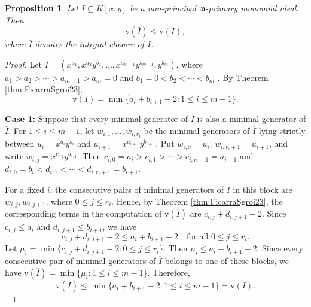 \documentclass[11pt,reqno,a4paper]{amsart}
\newtheorem{proposition}[theorem]{Proposition}
\theoremstyle{definition}
\begin{document}
\begin{proposition}\label{{v(I^bar)<=v(I)}}
Let \(I\subseteq K[x,y]\) be a non-principal \(\mathfrak m\)-primary
monomial ideal. Then
\[
\mathrm{v}(\overline{I})\leq \mathrm{v}(I),
\]
where \(\overline{I}\) denotes the integral closure of \(I\).
\end{proposition}

\begin{proof}
Let
\(I=(x^{a_1},x^{a_2}y^{b_2},\ldots,
x^{a_{m-1}}y^{b_{m-1}},y^{b_m})\), where
\(a_1>a_2>\cdots>a_{m-1}>a_{m}=0\) and
\(b_1=0<b_2<\cdots<b_m\) . 
By Theorem \ref{thm:FicarraSgroi23},
\begin{equation}\label{eq:vI}
\mathrm{v}(I)
=\min\{a_i+b_{i+1}-2:1\leq i\leq m-1\}.
\end{equation}



\noindent\textbf{Case 1:}
Suppose that every minimal generator of \(I\) is also a minimal
generator of \(\overline{I}\). For \(1\leq i\leq m-1\), let
\(w_{i,1},\ldots,w_{i,r_i}\) be the minimal generators of
\(\overline{I}\) lying strictly between
\(u_i=x^{a_i}y^{b_i}\) and
\(u_{i+1}=x^{a_{i+1}}y^{b_{i+1}}\). Put
\(w_{i,0}=u_i\), \(w_{i,r_i+1}=u_{i+1}\), and write
\(w_{i,j}=x^{c_{i,j}}y^{d_{i,j}}\). Then
\(c_{i,0}=a_i>c_{i,1}>\cdots>c_{i,r_i+1}=a_{i+1}\) and
\(d_{i,0}=b_i<d_{i,1}<\cdots<d_{i,r_i+1}=b_{i+1}\).

\noindent For a fixed \(i\), the consecutive pairs of minimal generators of
\(\overline{I}\) in this block are
\(w_{i,j},w_{i,j+1}\), where \(0\leq j\leq r_i\). Hence, by Theorem
\ref{thm:FicarraSgroi23}, the corresponding terms in the
computation of \(\mathrm{v}(\overline{I})\) are
\(c_{i,j}+d_{i,j+1}-2\). Since \(c_{i,j}\leq a_i\) and
\(d_{i,j+1}\leq b_{i+1}\), we have
\[
c_{i,j}+d_{i,j+1}-2\leq a_i+b_{i+1}-2
\quad\text{for all }0\leq j\leq r_i.
\]
Let
\(\mu_i=\min\{c_{i,j}+d_{i,j+1}-2:0\leq j\leq r_i\}\).
Then \(\mu_i\leq a_i+b_{i+1}-2\). Since every consecutive pair of
minimal generators of \(\overline{I}\) belongs to one of these
blocks, we have
\(\mathrm{v}(\overline{I})=\min\{\mu_i:1\leq i\leq m-1\}\).
Therefore,
\[
\mathrm{v}(\overline{I})
\leq
\min\{a_i+b_{i+1}-2:1\leq i\leq m-1\}
=\mathrm{v}(I).
\]


\end{proof}
\end{document}
